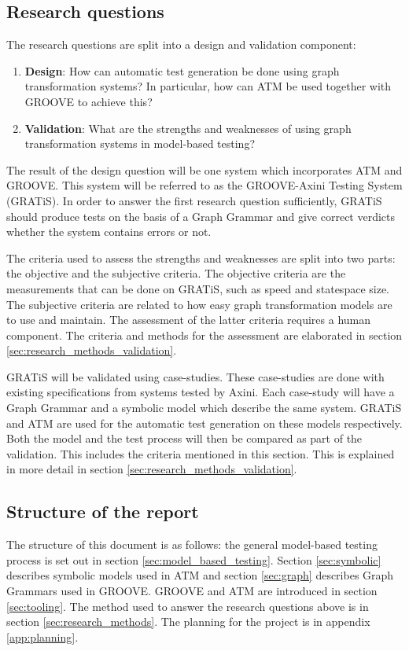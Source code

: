 \subsection{Research questions}\label{sec:questions}
The research questions are split into a design and validation component:
\begin{enumerate}
    \item \textbf{Design}: How can automatic test generation be done using graph transformation systems? In particular, how can ATM be used together with GROOVE to achieve this?
    \item \textbf{Validation}: What are the strengths and weaknesses of using graph transformation systems in model-based testing?
\end{enumerate}

The result of the design question will be one system which incorporates ATM and GROOVE. This system will be referred to as the GROOVE-Axini Testing System (GRATiS). In order to answer the first research question sufficiently, GRATiS should produce tests on the basis of a Graph Grammar and give correct verdicts whether the system contains errors or not.

The criteria used to assess the strengths and weaknesses are split into two parts: the objective and the subjective criteria. The objective criteria are the measurements that can be done on GRATiS, such as speed and statespace size. The subjective criteria are related to how easy graph transformation models are to use and maintain. The assessment of the latter criteria requires a human component. The criteria and methods for the assessment are elaborated in section \ref{sec:research_methods_validation}.

GRATiS will be validated using case-studies. These case-studies are done with existing specifications from systems tested by Axini. Each case-study will have a Graph Grammar and a symbolic model which describe the same system. GRATiS and ATM are used for the automatic test generation on these models respectively. Both the model and the test process will then be compared as part of the validation. This includes the criteria mentioned in this section. This is explained in more detail in section \ref{sec:research_methods_validation}.

\subsection{Structure of the report}
The structure of this document is as follows: the general model-based testing process is set out in section \ref{sec:model_based_testing}. Section \ref{sec:symbolic} describes symbolic models used in ATM and section \ref{sec:graph} describes Graph Grammars used in GROOVE. GROOVE and ATM are introduced in section \ref{sec:tooling}. The method used to answer the research questions above is in section \ref{sec:research_methods}. The planning for the project is in appendix \ref{app:planning}.
